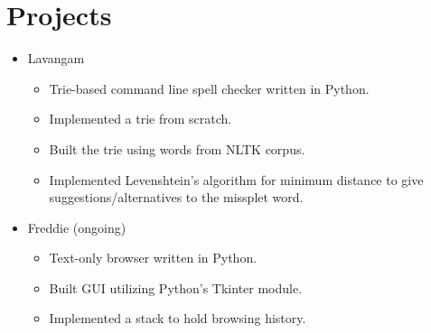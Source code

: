 \documentclass{article}
\begin{document}
\section*{Projects}
\begin{itemize}
\item Lavangam
	\begin{itemize}
	\item \small Trie-based command line spell checker written in Python.
	\item \small Implemented a trie from scratch.
	\item \small Built the trie using words from NLTK corpus.
	\item \small Implemented Levenshtein's algorithm for minimum distance to give suggestions/alternatives to the missplet word.
	\end{itemize}
\item Freddie (ongoing)
	\begin{itemize}
	\item \small Text-only browser written in Python.
	\item \small Built GUI utilizing Python's Tkinter module.
	\item \small Implemented a stack to hold browsing history.
	\end{itemize}
\end{itemize}
\end{document}
